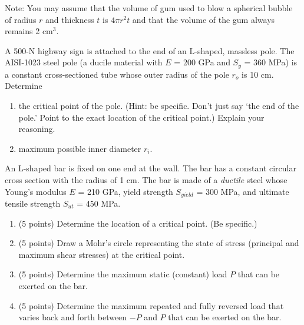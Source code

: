 \documentclass[
10pt,
a4paper,
openany,
svgnames,
]{kaobook} %
\begin{document}
\begin{exercises}
    Note: You may assume that the volume of gum used to blow a spherical bubble of radius $r$ and thickness $t$ is $4\pi r^2 t$ and that the volume of the gum always remains 2 cm$^3$.

  \item A 500-N highway sign is attached to the end of an L-shaped, massless pole. The AISI-1023 steel pole (a ducile material with $E$ = 200 GPa and $S_y$ = 360 MPa) is a constant cross-sectioned tube whose outer radius of the pole $r_o$ is 10 cm. Determine

  \begin{enumerate}
  \item the critical point of the pole. (Hint: be specific. Don't just say `the end of the pole.' Point to the exact location of the critical point.) Explain your reasoning.
  \item maximum possible inner diameter $r_i$.
  \end{enumerate}
  
\item An L-shaped bar is fixed on one end at the wall. The bar has a constant circular cross section with the radius of 1 cm. The bar is made of a \emph{ductile} steel whose Young's modulus $E$ = 210 GPa, yield strength $S_{yield}$ = 300 MPa, and ultimate tensile strength $S_{ut}$ = 450 MPa.

  \begin{center}
  \end{center}

  \begin{enumerate}
  \item (5 points) Determine the location of a critical point. (Be specific.)
  \item (5 points) Draw a Mohr's circle representing the state of stress (principal and maximum shear stresses) at the critical point.
  \item (5 points) Determine the maximum static (constant) load $P$ that can be exerted on the bar.
  \item (5 points) Determine the maximum repeated and fully reversed load that varies back and forth between $-P$ and $P$ that can be exerted on the bar.
  \end{enumerate}


\end{exercises}
\end{document}
